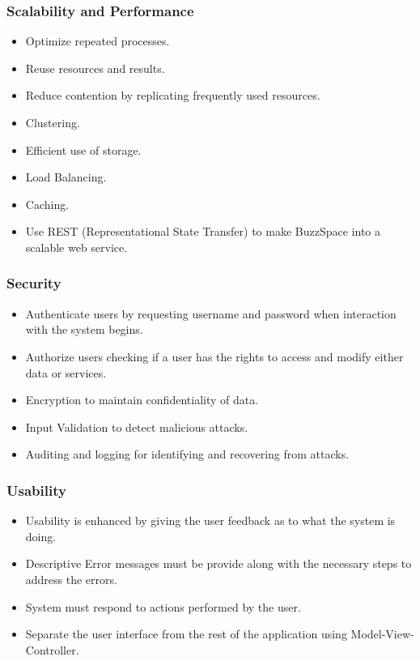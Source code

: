 \subsubsection*{Scalability and Performance}
	\begin{itemize}
		\item Optimize repeated processes.
		\item Reuse resources and results.
		\item Reduce contention by replicating frequently used resources.
		\item Clustering.
		\item Efficient use of storage.
		\item Load Balancing.
		\item Caching.
		\item Use REST (Representational State Transfer) to make BuzzSpace into a scalable web service.
	\end{itemize}	
\subsubsection*{Security}
	\begin{itemize}
		\item Authenticate users by requesting username and password when interaction with the system begins.
		\item Authorize users checking if a user has the rights to access and modify either data or services.
		\item Encryption to maintain confidentiality of data.
		\item Input Validation to detect malicious attacks.
		\item Auditing and logging for identifying and recovering from attacks.
	\end{itemize}	
\subsubsection*{Usability}
	\begin{itemize}
		\item Usability is enhanced by giving the user feedback as to what the system is doing.
		\item Descriptive Error messages must be provide along with the necessary steps to address the errors.
		\item System must respond to actions performed by the user.
		\item Separate the user interface from the rest of the application using Model-View-Controller.
	\end{itemize}
